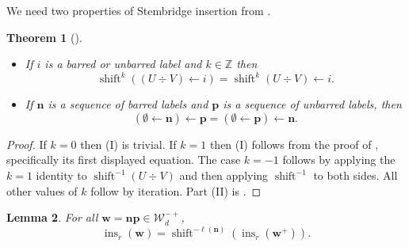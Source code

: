 \documentclass[12pt]{amsart}
\newcommand{\bs}{\boldsymbol}
\DeclareMathOperator{\ins}{\operatorname{ins}}
\newtheorem{theorem}{Theorem}[section]
\newtheorem{lemma}[theorem]{Lemma}
\theoremstyle{definition}
\theoremstyle{remark}
\begin{document}
We need two properties of Stembridge insertion from \cite{Stembridge}. 

\begin{theorem}[\!] \label{thm:Steminsprops}
\
\begin{itemize}
\item[(I)] If $i$ is a barred or unbarred label and $k\in {\mathbb Z}$ then 
\[\operatorname{shift}^k((U\div V) \leftarrow i)=\operatorname{shift}^k(U\div V)\leftarrow i.\]
\item[(II)] If ${\bs n}$ is a sequence of barred labels and ${\bs p}$ is a sequence of unbarred labels, then
\[(\emptyset\leftarrow {\bs n}) \leftarrow {\bs p} = (\emptyset\leftarrow {\bs p})\leftarrow {\bs n}.\]
\end{itemize}
\end{theorem}
\begin{proof}
If $k=0$ then (I) is trivial. If $k=1$ then (I) follows from the proof of
\cite[Theorem 3.6]{Stembridge}, specifically its first displayed equation.
The case $k=-1$ follows by applying the $k=1$ identity to
$\operatorname{shift}^{-1}(U\div V)$ and then applying
$\operatorname{shift}^{-1}$ to both sides. All other values of $k$
follow by iteration. Part (II) is \cite[Theorem 5.5]{Stembridge}.
\end{proof}

\begin{lemma} \label{lem:duality-shift-equiv}
For all ${\bs w}={\bs n}{\bs p}\in{\mathcal W}_d^{-+}$,
\begin{equation}\label{eqn:Apr30xyz}
\ins_r({\bs w}) =
\operatorname{shift}^{-\ell({\bs n})}
(\ins_r({\bs w}^+)).
\end{equation}
\end{lemma}
\end{document}
